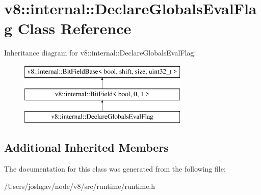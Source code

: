 \hypertarget{classv8_1_1internal_1_1_declare_globals_eval_flag}{}\section{v8\+:\+:internal\+:\+:Declare\+Globals\+Eval\+Flag Class Reference}
\label{classv8_1_1internal_1_1_declare_globals_eval_flag}
Inheritance diagram for v8\+:\+:internal\+:\+:Declare\+Globals\+Eval\+Flag\+:\begin{figure}[H]
\begin{center}
\leavevmode
\includegraphics[height=3.000000cm]{classv8_1_1internal_1_1_declare_globals_eval_flag}
\end{center}
\end{figure}
\subsection*{Additional Inherited Members}


The documentation for this class was generated from the following file\+:\begin{DoxyCompactItemize}
\item 
/\+Users/joshgav/node/v8/src/runtime/runtime.\+h\end{DoxyCompactItemize}

